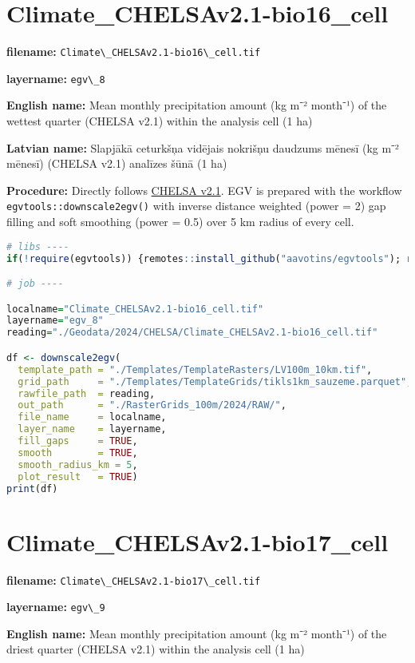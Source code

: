 \documentclass[
]{book}
\newcommand{\passthrough}[1]{#1}
\begin{document}
\section{Climate\_CHELSAv2.1-bio16\_cell}\label{ch06.008}

\textbf{filename:} \passthrough{\lstinline!Climate\_CHELSAv2.1-bio16\_cell.tif!}

\textbf{layername:} \passthrough{\lstinline!egv\_8!}

\textbf{English name:} Mean monthly precipitation amount (kg m⁻² month⁻¹) of the wettest quarter (CHELSA v2.1) within the analysis cell (1 ha)

\textbf{Latvian name:} Slapjākā ceturkšņa vidējais nokrišņu daudzums mēnesī (kg m⁻² mēnesī) (CHELSA v2.1) analīzes šūnā (1 ha)

\textbf{Procedure:} Directly follows \hyperref[Ch04.11]{CHELSA v2.1}. EGV is prepared with the
workflow \passthrough{\lstinline!egvtools::downscale2egv()!} with inverse distance weighted (power = 2)
gap filling and soft smoothing (power = 0.5) over 5 km radius of every cell.

\begin{lstlisting}[language=R]
# libs ----
if(!require(egvtools)) {remotes::install_github("aavotins/egvtools"); require(egvtools)}

# job ----

localname="Climate_CHELSAv2.1-bio16_cell.tif"
layername="egv_8"
reading="./Geodata/2024/CHELSA/Climate_CHELSAv2.1-bio16_cell.tif"

df <- downscale2egv(
  template_path = "./Templates/TemplateRasters/LV100m_10km.tif",
  grid_path     = "./Templates/TemplateGrids/tikls1km_sauzeme.parquet",
  rawfile_path  = reading,
  out_path      = "./RasterGrids_100m/2024/RAW/",
  file_name     = localname,
  layer_name    = layername,
  fill_gaps     = TRUE,
  smooth        = TRUE,
  smooth_radius_km = 5,
  plot_result   = TRUE)
print(df)
\end{lstlisting}

\section{Climate\_CHELSAv2.1-bio17\_cell}\label{ch06.009}

\textbf{filename:} \passthrough{\lstinline!Climate\_CHELSAv2.1-bio17\_cell.tif!}

\textbf{layername:} \passthrough{\lstinline!egv\_9!}

\textbf{English name:} Mean monthly precipitation amount (kg m⁻² month⁻¹) of the driest quarter (CHELSA v2.1) within the analysis cell (1 ha)
\end{document}
